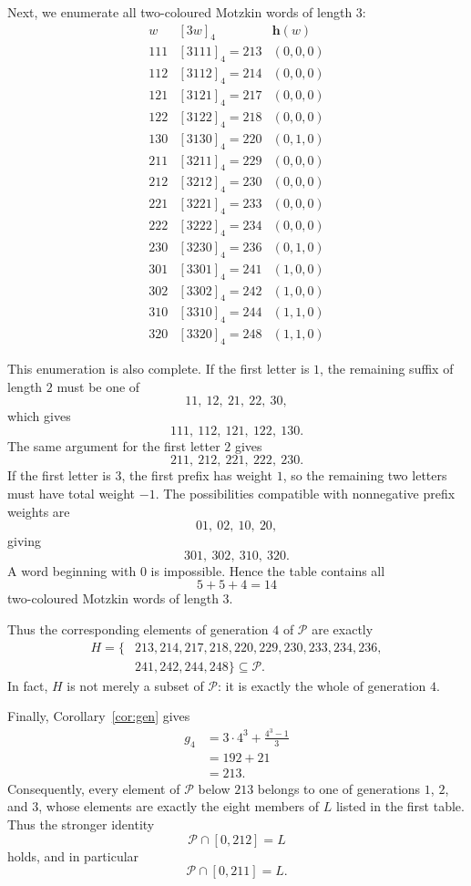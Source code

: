 \documentclass{ws-ijfcs}
\newcommand{\Pset}{\mathcal P}
\begin{document}
Next, we enumerate all two-coloured Motzkin words of length $3$:
\[
\begin{array}{c|c|c}
 w&[3w]_4&\mathbf h(w)\\ \hline
111 &[3111]_4=213&(0,0,0)\\
112 &[3112]_4=214&(0,0,0)\\
121 &[3121]_4=217&(0,0,0)\\
122 &[3122]_4=218&(0,0,0)\\
130 &[3130]_4=220&(0,1,0)\\ \hline
211 &[3211]_4=229&(0,0,0)\\
212 &[3212]_4=230&(0,0,0)\\
221 &[3221]_4=233&(0,0,0)\\
222 &[3222]_4=234&(0,0,0)\\
230 &[3230]_4=236&(0,1,0)\\ \hline
301 &[3301]_4=241&(1,0,0)\\
302 &[3302]_4=242&(1,0,0)\\
310 &[3310]_4=244&(1,1,0)\\
320 &[3320]_4=248&(1,1,0)
\end{array}
\]

This enumeration is also complete.  If the first letter is $1$, the
remaining suffix of length $2$ must be one of
\[
 11,\ 12,\ 21,\ 22,\ 30,
\]
which gives
\[
 111,\ 112,\ 121,\ 122,\ 130.
\]
The same argument for the first letter $2$ gives
\[
 211,\ 212,\ 221,\ 222,\ 230.
\]
If the first letter is $3$, the first prefix has weight $1$, so the
remaining two letters must have total weight $-1$.  The possibilities
compatible with nonnegative prefix weights are
\[
 01,\ 02,\ 10,\ 20,
\]
giving
\[
 301,\ 302,\ 310,\ 320.
\]
A word beginning with $0$ is impossible.  Hence the table contains all
\[
 5+5+4=14
\]
two-coloured Motzkin words of length $3$.

Thus the corresponding elements of generation $4$ of $\Pset$ are exactly
\begin{equation}\label{eq:H-def}
\begin{split}
 H=\{&213,214,217,218,220,229,230,233,234,236,\\
     &241,242,244,248\}
 \subseteq\Pset.
\end{split}
\end{equation}
In fact, $H$ is not merely a subset of $\Pset$: it is exactly the whole of
generation $4$.

Finally, Corollary~\ref{cor:gen} gives
\[
\begin{aligned}
 g_4
 &=3\cdot4^3+\frac{4^3-1}{3}\\
 &=192+21\\
 &=213.
\end{aligned}
\]
Consequently, every element of $\Pset$ below $213$ belongs to one of
generations $1$, $2$, and $3$, whose elements are exactly the eight
members of $L$ listed in the first table.  Thus the stronger identity
\[
 \Pset\cap[0,212]=L
\]
holds, and in particular
\begin{equation}\label{eq:P-small}
 \Pset\cap[0,211]=L.
\end{equation}
\end{document}
